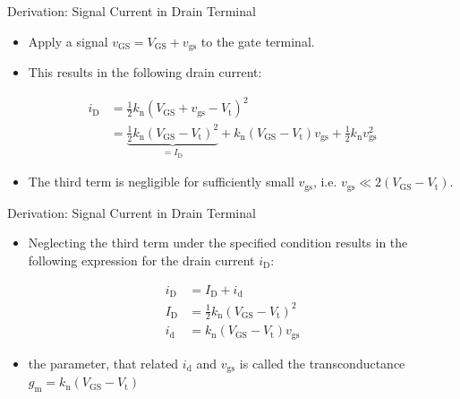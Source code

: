 \begin{frame}{Derivation: Signal Current in Drain Terminal}
    \begin{itemize}
        \item Apply a signal $v_{\mathrm{GS}}=V_{\mathrm{GS}}+v_{\mathrm{gs}}$ to the gate terminal.
        \item This results in the following drain current:
    \end{itemize}
    \begin{block}{}
        \setlength{\abovedisplayskip}{0pt}
        \setlength{\belowdisplayskip}{0pt}
        \begin{align*}
            i_{\mathrm{D}}&=\frac{1}{2}k_{\mathrm{n}}(V_{\mathrm{GS}}+v_{\mathrm{gs}}
            -V_{\mathrm{t}})^{2} \\
            &=\underbrace{ \frac{1}{2}k_{\mathrm{n}}(V_{\mathrm{GS}}-V_{\mathrm{t}})^{2} }_{ =I_{\mathrm{D}}}+
            k_{\mathrm{n}}(V_{\mathrm{GS}}-V_{\mathrm{t}})v_{\mathrm{gs}}
            +\frac{1}{2}k_{\mathrm{n}}v_{\mathrm{gs}}^{2}
        \end{align*}
    \end{block}
    \begin{itemize}
        \item The third term is negligible for sufficiently small $v_{\mathrm{gs}}$, i.e. 
        $v_{\mathrm{gs}}\ll 2(V_{\mathrm{GS}}-V_{\mathrm{t}})$.

    \end{itemize}
\end{frame}

\begin{frame}{Derivation: Signal Current in Drain Terminal}
    \begin{block}{}
        \begin{itemize}
            \item Neglecting the third term under the specified condition results in the following 
            expression for the drain current $i_{\mathrm{D}}$:
        \end{itemize}
        \begin{align*}
                i_{\mathrm{D}}&=I_{\mathrm{D}}+i_{\mathrm{d}} \\
                I_{\mathrm{D}}&=\frac{1}{2}k_{\mathrm{n}}(V_{\mathrm{GS}}-V_{\mathrm{t}})^{2} \\
                i_{\mathrm{d}}&=k_{\mathrm{n}}(V_{\mathrm{GS}}-V_{\mathrm{t}})v_{\mathrm{gs}}
        \end{align*}
    \end{block}

    \begin{itemize}
        \item the parameter, that related $i_{\mathrm{d}}$ and $v_{\mathrm{gs}}$ is called the 
        transconductance $g_{\mathrm{m}}=k_{\mathrm{n}}(V_{\mathrm{GS}}-V_{\mathrm{t}})$ 
    \end{itemize} 
\end{frame}

